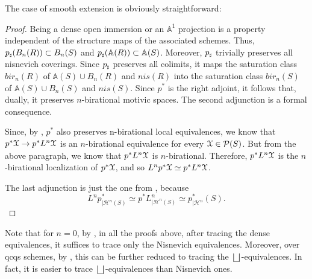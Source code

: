 The case of smooth extension is obviously straightforward:
\begin{proof}
    Being a dense open immersion or an $\mathbb{A}^1$ projection is a property independent of the structure maps of the associated schemes. Thus, $p_{{\mathord{\text{\tiny $\sharp$}}}} (B_n(R))\subset  B_n(S)$ and $p_{{\mathord{\text{\tiny $\sharp$}}}} (\mathbb{A}(R))\subset  \mathbb{A}(S)$. Moreover, $p_{\mathord{\text{\tiny $\sharp$}}}$ trivially preserves all nisnevich coverings. Since $p_{\mathord{\text{\tiny $\sharp$}}}$ preserves all colimits, it maps the saturation class $bir_n(R)$ of $\mathbb{A}(S)\cup B_n(R)$ and $nis(R)$ into the saturation class $bir_n(S)$ of $\mathbb{A}(S)\cup B_n(S)$ and $nis(S)$. Since $p^*$ is the right adjoint, it follows that, dually, it preserves $n$-birational motivic spaces. The second adjunction is a formal consequence. 
    
    
    Since, by , $p^*$ also preserves n-birational local equivalences, we know that $p^*\EuScript{X}\to p^*L^n\EuScript{X}$ is an $n$-birational equivalence for every $\EuScript{X}\in \mathcal{P}(S)$. But from the above paragraph, we know that $p^*L^n\EuScript{X}$ is $n$-birational. Therefore, $p^*L^n\EuScript{X}$ is the $n$-birational localization of $p^*\EuScript{X}$, and so $L^np^*\EuScript{X}\simeq p^*L^n\EuScript{X}$. 

    The last adjunction is just the one from , because $$L^np^*_{|\mathcal{H}^n(S)}\simeq p^*L^n_{|\mathcal{H}^n(S)}\simeq p^*_{|\mathcal{H}^n}(S).$$
    \end{proof}
    \begin{rem}
Note that for $n=0$, by , in all the proofs above, after tracing the dense equivalences, it suffices to trace only the Nisnevich equivalences. Moreover, over qcqs schemes, by , this can be further reduced to tracing the $\bigsqcup$-equivalences. In fact, it is easier to trace $\bigsqcup$-equivalences than Nisnevich ones.
\end{rem}
